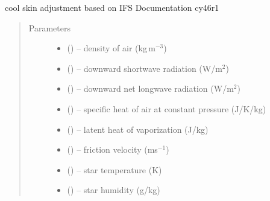 \documentclass[letterpaper,10pt,english]{sphinxmanual}
\begin{document}
\begin{fulllineitems}
\label{\detokenize{index:cs_wl_subs.cs_ecmwf}}
cool skin adjustment based on IFS Documentation cy46r1 \citep{era5_2019}
\begin{quote}\begin{description}
\item[{Parameters}] \leavevmode\begin{itemize}
\item {} 
 (\href{https://docs.python.org/3/library/functions.html\#float}{}) -- density of air (kg\,m$^{-3}$)

\item {} 
 (\href{https://docs.python.org/3/library/functions.html\#float}{}) -- downward shortwave radiation (W/m$^2$)

\item {} 
 (\href{https://docs.python.org/3/library/functions.html\#float}{}) -- downward net longwave radiation (W/m$^2$)

\item {} 
 (\href{https://docs.python.org/3/library/functions.html\#float}{}) -- specific heat of air at constant pressure (J/K/kg)

\item {} 
 (\href{https://docs.python.org/3/library/functions.html\#float}{}) -- latent heat of vaporization (J/kg)

\item {} 
 (\href{https://docs.python.org/3/library/functions.html\#float}{}) -- friction velocity (ms$^{-1}$)

\item {} 
 (\href{https://docs.python.org/3/library/functions.html\#float}{}) -- star temperature (K)

\item {} 
 (\href{https://docs.python.org/3/library/functions.html\#float}{}) -- star humidity (g/kg)


\end{itemize}
\end{description}
\end{quote}
\end{fulllineitems}
\end{document}
